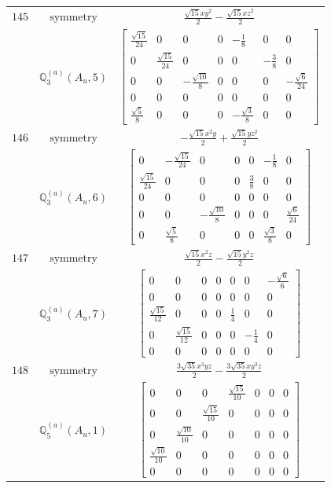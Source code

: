 \documentclass[fleqn,8pt,landscape]{jsarticle}
\begin{document}
\begin{longtable}{ccc}
$ 145 $ & $ \text{symmetry} $ & $ \frac{\sqrt{15} x y^{2}}{2} - \frac{\sqrt{15} x z^{2}}{2} $ \\
$  $ & $ \mathbb{Q}_{3}^{(a)}(A_{u},5) $ & $ \begin{bmatrix} \frac{\sqrt{15}}{24} & 0 & 0 & 0 & - \frac{1}{8} & 0 & 0 \\ 0 & \frac{\sqrt{15}}{24} & 0 & 0 & 0 & - \frac{3}{8} & 0 \\ 0 & 0 & - \frac{\sqrt{10}}{8} & 0 & 0 & 0 & - \frac{\sqrt{6}}{24} \\ 0 & 0 & 0 & 0 & 0 & 0 & 0 \\ \frac{\sqrt{5}}{8} & 0 & 0 & 0 & - \frac{\sqrt{3}}{8} & 0 & 0 \end{bmatrix} $ \\ \hline
$ 146 $ & $ \text{symmetry} $ & $ - \frac{\sqrt{15} x^{2} y}{2} + \frac{\sqrt{15} y z^{2}}{2} $ \\
$  $ & $ \mathbb{Q}_{3}^{(a)}(A_{u},6) $ & $ \begin{bmatrix} 0 & - \frac{\sqrt{15}}{24} & 0 & 0 & 0 & - \frac{1}{8} & 0 \\ \frac{\sqrt{15}}{24} & 0 & 0 & 0 & \frac{3}{8} & 0 & 0 \\ 0 & 0 & 0 & 0 & 0 & 0 & 0 \\ 0 & 0 & - \frac{\sqrt{10}}{8} & 0 & 0 & 0 & \frac{\sqrt{6}}{24} \\ 0 & \frac{\sqrt{5}}{8} & 0 & 0 & 0 & \frac{\sqrt{3}}{8} & 0 \end{bmatrix} $ \\ \hline
$ 147 $ & $ \text{symmetry} $ & $ \frac{\sqrt{15} x^{2} z}{2} - \frac{\sqrt{15} y^{2} z}{2} $ \\
$  $ & $ \mathbb{Q}_{3}^{(a)}(A_{u},7) $ & $ \begin{bmatrix} 0 & 0 & 0 & 0 & 0 & 0 & - \frac{\sqrt{6}}{6} \\ 0 & 0 & 0 & 0 & 0 & 0 & 0 \\ \frac{\sqrt{15}}{12} & 0 & 0 & 0 & \frac{1}{4} & 0 & 0 \\ 0 & \frac{\sqrt{15}}{12} & 0 & 0 & 0 & - \frac{1}{4} & 0 \\ 0 & 0 & 0 & 0 & 0 & 0 & 0 \end{bmatrix} $ \\ \hline
$ 148 $ & $ \text{symmetry} $ & $ \frac{3 \sqrt{35} x^{3} y z}{2} - \frac{3 \sqrt{35} x y^{3} z}{2} $ \\
$  $ & $ \mathbb{Q}_{5}^{(a)}(A_{u},1) $ & $ \begin{bmatrix} 0 & 0 & 0 & \frac{\sqrt{15}}{10} & 0 & 0 & 0 \\ 0 & 0 & \frac{\sqrt{15}}{10} & 0 & 0 & 0 & 0 \\ 0 & \frac{\sqrt{10}}{10} & 0 & 0 & 0 & 0 & 0 \\ \frac{\sqrt{10}}{10} & 0 & 0 & 0 & 0 & 0 & 0 \\ 0 & 0 & 0 & 0 & 0 & 0 & 0 \end{bmatrix} $ \\ \hline

\end{longtable}
\end{document}

